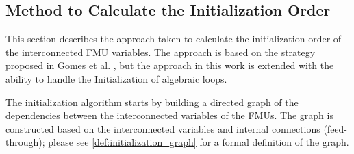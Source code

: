 \subsection{Method to Calculate the Initialization Order}
This section describes the approach taken to calculate the initialization order of the interconnected FMU variables. The approach is based on the strategy proposed in Gomes et al. \cite{Gomes2019b, BromanCompositionCo-Simulation}, but the approach in this work is extended with the ability to handle the Initialization of algebraic loops. 

The initialization algorithm starts by building a directed graph of the dependencies between the interconnected variables of the FMUs. The graph is constructed based on the interconnected variables and internal connections (feed-through); please see \cref{def:initialization_graph} for a formal definition of the graph. 


